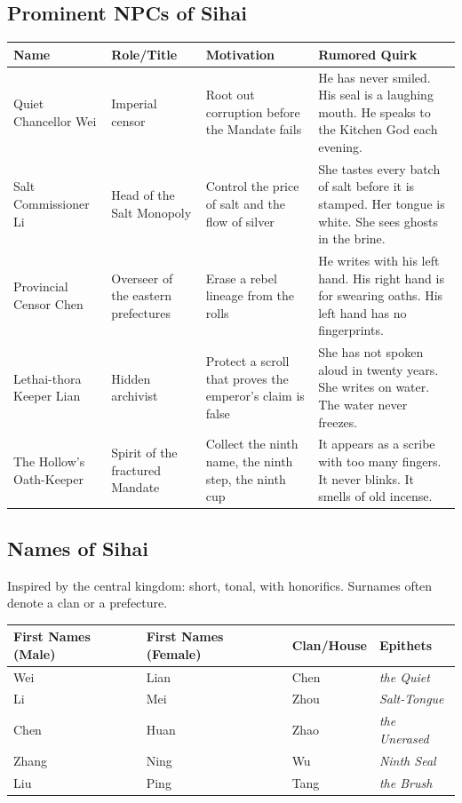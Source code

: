 \subsection*{Prominent NPCs of Sihai}
\label{sec:sihai-npcs}

\begin{longtable}{|p{}|p{}|p{}|p{}|}
\hline
\textbf{Name} & \textbf{Role/Title} & \textbf{Motivation} & \textbf{Rumored Quirk} \\
\hline
Quiet Chancellor Wei & Imperial censor & Root out corruption before the Mandate fails & He has never smiled. His seal is a laughing mouth. He speaks to the Kitchen God each evening. \\
\hline
Salt Commissioner Li & Head of the Salt Monopoly & Control the price of salt and the flow of silver & She tastes every batch of salt before it is stamped. Her tongue is white. She sees ghosts in the brine. \\
\hline
Provincial Censor Chen & Overseer of the eastern prefectures & Erase a rebel lineage from the rolls & He writes with his left hand. His right hand is for swearing oaths. His left hand has no fingerprints. \\
\hline
Lethai-thora Keeper Lian & Hidden archivist & Protect a scroll that proves the emperor's claim is false & She has not spoken aloud in twenty years. She writes on water. The water never freezes. \\
\hline
The Hollow's Oath-Keeper & Spirit of the fractured Mandate & Collect the ninth name, the ninth step, the ninth cup & It appears as a scribe with too many fingers. It never blinks. It smells of old incense. \\
\hline
\end{longtable}

\subsection*{Names of Sihai}
\label{sec:sihai-names}

Inspired by the central kingdom: short, tonal, with honorifics. Surnames often denote a clan or a prefecture.

\begin{longtable}{|p{}|p{}|p{}|p{}|}
\hline
\textbf{First Names (Male)} & \textbf{First Names (Female)} & \textbf{Clan/House} & \textbf{Epithets} \\
\hline
Wei & Lian & Chen & \textit{the Quiet} \\
\hline
Li & Mei & Zhou & \textit{Salt-Tongue} \\
\hline
Chen & Huan & Zhao & \textit{the Unerased} \\
\hline
Zhang & Ning & Wu & \textit{Ninth Seal} \\
\hline
Liu & Ping & Tang & \textit{the Brush} \\
\hline
\end{longtable}

